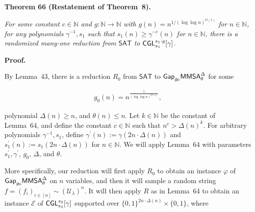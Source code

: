 

\par\medskip\noindent\textbf{
\textbf{Theorem 66}\textbf{ }(Restatement of Theorem 8)\textbf{.}
}\par



\emph{For some constant $c\in\mathbb{N}$ and $g:\mathbb{N}\to\mathbb{N}$ with $g(n)=n^{1/(\log\log n)^{O(1)}}$ for $n\in\mathbb{N}$, for any polynomials $\gamma^{-1},s_{1}$ such that $s_{1}(n)\geq\gamma^{-c}(n)$ for $n\in\mathbb{N}$, there is a randomized many-one reduction from ${\mathsf{SAT}}$ to ${\sf CGL}_{s_{1}}^{s_{1}\cdot g}[\gamma]$.}\par







\par\medskip\noindent\textbf{Proof.}\par




By Lemma 43, there is a reduction $R_{0}$ from ${\mathsf{SAT}}$ to ${\sf Gap}_{g_{0}}{\mathsf{MMSA}}_{\theta}^{\Delta}$ for some\par


\[\begin{gathered}
g_{0}(n)=n^{\frac{1}{(\log\log n)^{O(1)}}},
\end{gathered}\]


polynomial $\Delta(n)\geq n$, and $\theta(n)\leq n$. Let $k\in\mathbb{N}$ be the constant of Lemma 64, and define the constant $c\in\mathbb{N}$ such that $n^{c}>\Delta(n)^{k}$. For arbitrary polynomials $\gamma^{-1},s_{1}$, define $\gamma^{\prime}(n):=\gamma(2n\cdot\Delta(n))$ and $s_{1}^{\prime}(n):=s_{1}(2n\cdot\Delta(n))$ for $n\in\mathbb{N}$. We will apply Lemma 64 with parameters $s_{1}^{\prime},\gamma^{\prime}$, $g_{0}$, $\Delta$, and $\theta$.\par




More specifically, our reduction will first apply $R_{0}$ to obtain an instance $\varphi$ of ${\sf Gap}_{g_{0}}{\mathsf{MMSA}}_{\theta}^{\Delta}$ on $n$ variables, and then it will sample a random string $f=(f_{i})_{i\in[n]}\sim(\mathcal{U}_{\lambda})^{n}$. It will then apply $R$ as in Lemma 64 to obtain an instance $\mathcal{E}$ of ${\sf CGL}_{s_{1}}^{s_{2}}[\gamma]$ supported over $\{0,1\}^{2n\cdot\Delta(n)}\times\{0,1\}$, where\par


